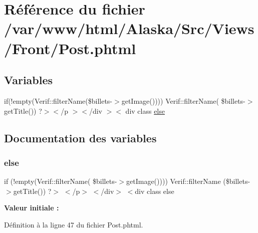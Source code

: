 \hypertarget{_post_8phtml}{}\section{Référence du fichier /var/www/html/\+Alaska/\+Src/\+Views/\+Front/\+Post.phtml}
\label{_post_8phtml}
\subsection*{Variables}
\begin{DoxyCompactItemize}
\item 
if(!empty(Verif\+::filter\+Name(\$billets-\/$>$get\+Image()))) Verif\+::filter\+Name( \$billets-\/$>$get\+Title()) ?$>$$<$/p $>$$<$/div $>$$<$ div class \hyperlink{_post_8phtml_a1b3147c3812ec28a287cd73eb1d680d8}{else}
\end{DoxyCompactItemize}


\subsection{Documentation des variables}
\mbox{\label{_post_8phtml_a1b3147c3812ec28a287cd73eb1d680d8}} 
\subsubsection{\texorpdfstring{else}{else}}
{\footnotesize\ttfamily if (!empty(Verif\+::filter\+Name( \$billets-\/$>$get\+Image()))) Verif\+::filter\+Name (\$billets-\/$>$get\+Title()) ?$>$ $<$/p$>$ $<$/div$>$ $<$div class else}

{\bfseries Valeur initiale \+:}


Définition à la ligne 47 du fichier Post.\+phtml.

